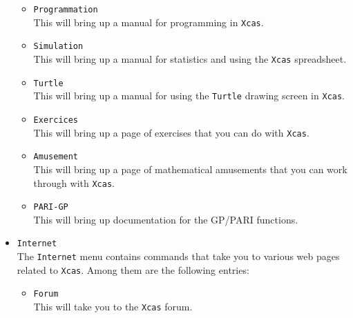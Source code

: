 \documentclass[a4paper,11pt]{book}
\begin{document}
\begin{itemize}
\begin{itemize}
  \item \texttt{Programmation}\\
  This will bring up a manual for programming in \texttt{Xcas}.
  
  \item \texttt{Simulation}\\
  This will bring up a manual for statistics and using the
  \texttt{Xcas} spreadsheet.
  
  \item \texttt{Turtle}\\
  This will bring up a manual for using the \texttt{Turtle} drawing
  screen in \texttt{Xcas}.
  
  \item \texttt{Exercices}\\
  This will bring up a page of exercises that you can do with
  \texttt{Xcas}.
  
  \item \texttt{Amusement}\\
  This will bring up a page of mathematical amusements that you can
  work through with \texttt{Xcas}.
  
  \item \texttt{PARI-GP}\\
  This will bring up documentation for the GP/PARI functions.
  \end{itemize}

  \item \texttt{Internet}\\
  The \texttt{Internet} menu contains commands that take you to
  various web pages related to \texttt{Xcas}.  Among them are the
  following entries:
  \begin{itemize}
    \item \texttt{Forum}\\
    This will take you to the \texttt{Xcas} forum.
    
    
    
    

\end{itemize}
\end{itemize}
\end{document}

